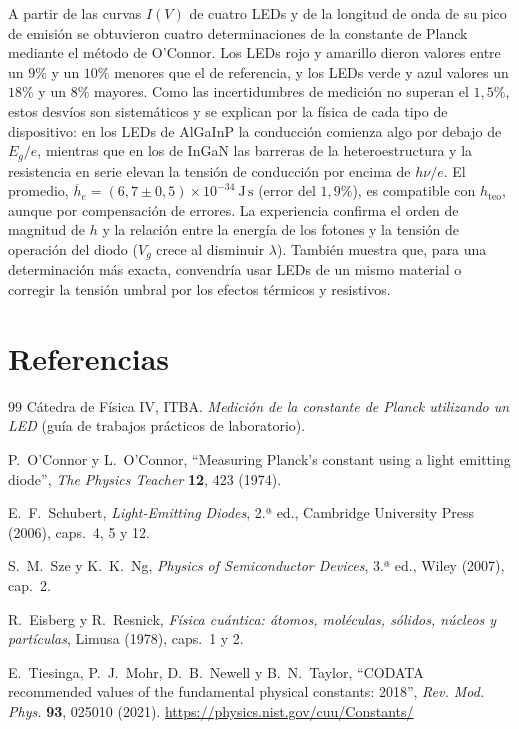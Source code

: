 \documentclass{article}
\newcommand{\Js}{\ \mathrm{J\,s}}
\begin{document}
A partir de las curvas $I(V)$ de cuatro LEDs y de la longitud de onda de su pico de emisión se obtuvieron cuatro determinaciones de la constante de Planck mediante el método de O'Connor. Los LEDs rojo y amarillo dieron valores entre un $9\%$ y un $10\%$ menores que el de referencia, y los LEDs verde y azul valores un $18\%$ y un $8\%$ mayores. Como las incertidumbres de medición no superan el $1,5\%$, estos desvíos son sistemáticos y se explican por la física de cada tipo de dispositivo: en los LEDs de AlGaInP la conducción comienza algo por debajo de $E_g/e$, mientras que en los de InGaN las barreras de la heteroestructura y la resistencia en serie elevan la tensión de conducción por encima de $h\nu/e$. El promedio, $\overline{h}_e=(6,7\pm0,5)\times10^{-34}\Js$ (error del $1,9\%$), es compatible con $h_{\mathrm{teo}}$, aunque por compensación de errores. La experiencia confirma el orden de magnitud de $h$ y la relación entre la energía de los fotones y la tensión de operación del diodo ($V_g$ crece al disminuir $\lambda$). También muestra que, para una determinación más exacta, convendría usar LEDs de un mismo material o corregir la tensión umbral por los efectos térmicos y resistivos.

\section{Referencias}
\begingroup
\renewcommand{\section}[2]{}
\begin{thebibliography}{99}
 Cátedra de Física IV, ITBA. \emph{Medición de la constante de Planck utilizando un LED} (guía de trabajos prácticos de laboratorio).

 P.~O'Connor y L.~O'Connor, ``Measuring Planck's constant using a light emitting diode'', \emph{The Physics Teacher} \textbf{12}, 423 (1974).

 E.~F.~Schubert, \emph{Light-Emitting Diodes}, 2.ª ed., Cambridge University Press (2006), caps.~4, 5 y 12.

 S.~M.~Sze y K.~K.~Ng, \emph{Physics of Semiconductor Devices}, 3.ª ed., Wiley (2007), cap.~2.

 R.~Eisberg y R.~Resnick, \emph{Física cuántica: átomos, moléculas, sólidos, núcleos y partículas}, Limusa (1978), caps.~1 y 2.

 E.~Tiesinga, P.~J.~Mohr, D.~B.~Newell y B.~N.~Taylor, ``CODATA recommended values of the fundamental physical constants: 2018'', \emph{Rev. Mod. Phys.} \textbf{93}, 025010 (2021). \url{https://physics.nist.gov/cuu/Constants/}
\end{thebibliography}
\endgroup
\end{document}
